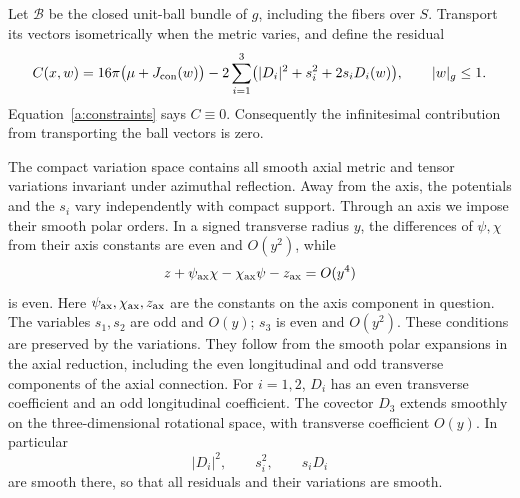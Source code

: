 Let \(\mathcal B\) be the closed unit-ball bundle of \(g\), including the
fibers over \(S\). Transport its vectors isometrically when the metric
varies, and define the residual
\begin{equation}
\label{j:residual}
 C(x,w)=16\pi\bigl(\mu+J_{\rm con}(w)\bigr)
   -2\sum_{i=1}^3\bigl(|D_i|^2+s_i^2+2s_iD_i(w)\bigr),
 \qquad |w|_g\leq1.
\end{equation}
Equation~\eqref{a:constraints} says \(C\equiv0\). Consequently the
infinitesimal contribution from transporting the ball vectors is zero.

The compact variation space contains all smooth axial metric and tensor
variations invariant under azimuthal reflection. Away from the axis,
the potentials and the \(s_i\) vary independently with compact support.
Through an axis we impose their smooth polar orders. In a signed
transverse radius \(y\), the differences of \(\psi,\chi\) from their axis
constants are even and \(O(y^2)\), while
\[
 z+\psi_{\rm ax}\chi-\chi_{\rm ax}\psi
       -z_{\rm ax}=O(y^4)
\]
is even. Here \(\psi_{\rm ax},\chi_{\rm ax},z_{\rm ax}\) are the constants
on the axis component in question. The variables \(s_1,s_2\) are odd
and \(O(y)\); \(s_3\) is even and \(O(y^2)\).
These conditions are preserved by the variations. They follow from
the smooth polar expansions in the axial reduction, including the even
longitudinal and odd transverse components of the axial connection.
For \(i=1,2\), \(D_i\) has an even transverse coefficient and an odd
longitudinal coefficient. The covector \(D_3\) extends smoothly on the
three-dimensional rotational space, with transverse coefficient \(O(y)\).
In particular
\[
 |D_i|^2,\qquad s_i^2,\qquad s_iD_i
\]
are smooth there, so that all residuals and their variations are smooth.

